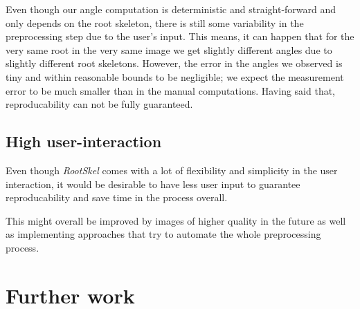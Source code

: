 Even though our angle computation is deterministic and straight-forward and only depends on the root skeleton, there is still some variability in the preprocessing step due to the user's input. This means, it can happen that for the very same root in the very same image we get slightly different angles due to slightly different root skeletons. %
However, the error in the angles we observed is tiny and within reasonable bounds to be negligible; we expect the measurement error to be much smaller than in the manual computations. Having said that, reproducability can not be fully guaranteed. %


\subsection{High user-interaction}

Even though \textit{RootSkel} comes with a lot of flexibility and simplicity in the user interaction, it would be desirable to have less user input to guarantee reproducability and save time in the process overall. 

This might overall be improved by images of higher quality in the future as well as implementing approaches that try to automate the whole preprocessing process.








 
\section{Further work}

